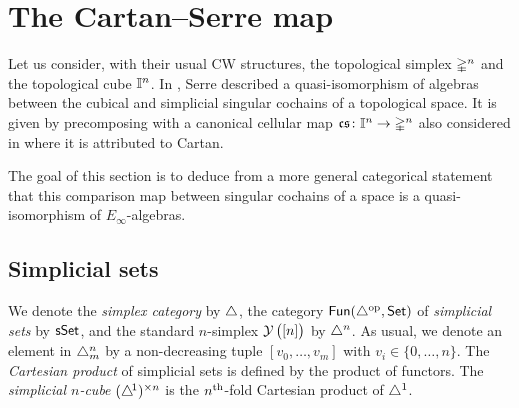 
\section{The Cartan--Serre map} \label{s:comparison}

Let us consider, with their usual CW structures, the topological simplex $\mathbb{\Delta}^n$ and the topological cube $\mathbb{I}^n$.
In \cite[p. 442]{serre1951homologie}, Serre described a quasi-isomorphism of algebras between the cubical and simplicial singular cochains of a topological space.
It is given by precomposing with a canonical cellular map $\operatorname{\mathfrak{cs}} \colon \mathbb{I}^n \to \mathbb{\Delta}^n$ also considered in \cite[p.199]{eilenberg1953acyclic} where it is attributed to Cartan.

The goal of this section is to deduce from a more general categorical statement that this comparison map between singular cochains of a space is a quasi-isomorphism of $E_\infty$-algebras.

\subsection{Simplicial sets} \label{ss:simplicial sets}


We denote the \textit{simplex category} by $\triangle$, the category $\mathsf{Fun}(\triangle^{\mathrm{op}}, \mathsf{Set})$ of \textit{simplicial sets} by $\mathsf{sSet}$, and the standard $n$-simplex $\operatorname{\mathcal{Y}} \big( [n] \big)$ by $\triangle^n$.
As usual, we denote an element in $\triangle^n_m$ by a non-decreasing tuple $[v_0, \dots, v_m]$ with $v_i \in \{0, \dots, n\}$.
The \textit{Cartesian product} of simplicial sets is defined by the product of functors.
The \textit{simplicial $n$-cube} $(\triangle^{\!1})^{\times n}$ is the $n^{\mathrm{th}}$-fold Cartesian product of $\triangle^1$.


